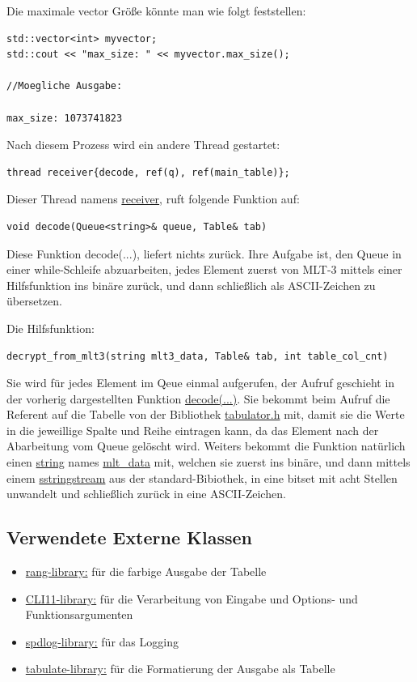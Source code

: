 \documentclass{article}
\begin{document}
Die maximale vector Größe könnte man
wie folgt feststellen:
\begin{lstlisting}
std::vector<int> myvector;
std::cout << "max_size: " << myvector.max_size();

//Moegliche Ausgabe:

max_size: 1073741823
\end{lstlisting}


Nach diesem Prozess wird ein andere Thread gestartet:
\begin{lstlisting}
thread receiver{decode, ref(q), ref(main_table)};
\end{lstlisting}

Dieser Thread namens \underline{receiver}, ruft folgende Funktion auf:
\begin{lstlisting}
void decode(Queue<string>& queue, Table& tab)
\end{lstlisting}
Diese Funktion decode(...), liefert nichts zurück. Ihre Aufgabe ist, den Queue in einer while-Schleife abzuarbeiten, jedes Element zuerst von MLT-3 mittels einer Hilfsfunktion 
ins binäre zurück, und dann schließlich als ASCII-Zeichen zu übersetzen.

Die Hilfsfunktion:
\begin{lstlisting}
decrypt_from_mlt3(string mlt3_data, Table& tab, int table_col_cnt)
\end{lstlisting}

Sie wird für jedes Element im Qeue einmal aufgerufen, der Aufruf geschieht in der vorherig dargestellten Funktion \underline{decode(...)}. Sie bekommt beim Aufruf die Referent auf die
Tabelle von der Bibliothek \underline{tabulator.h} mit, damit sie die Werte in die jeweillige Spalte und Reihe eintragen kann, da das Element nach der Abarbeitung vom Queue gelöscht wird.
Weiters bekommt die Funktion natürlich einen \underline{string} names \underline{mlt\_data} mit, welchen sie zuerst ins binäre, und dann mittels einem \underline{sstringstream} aus 
der standard-Bibiothek, in eine bitset mit acht Stellen unwandelt und schließlich zurück in eine ASCII-Zeichen.


\subsection{Verwendete Externe Klassen}
\begin{itemize}
	\item \underline{rang-library:} für die farbige Ausgabe der Tabelle
	\item \underline{CLI11-library:} für die Verarbeitung von Eingabe und Options- und Funktionsargumenten
	\item \underline{spdlog-library:} für das Logging
	\item \underline{tabulate-library:} für die Formatierung der Ausgabe als Tabelle
\end{itemize}
\end{document}

